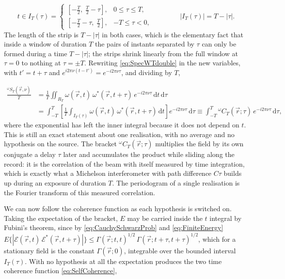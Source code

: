 		\begin{equation}\label{eq:StripLimits}
			t\in I_{T}(\tau) =
			\begin{cases}
				\left[-\frac{T}{2},\;\frac{T}{2}-\tau\right], & 0\leq\tau\leq T,\\[2mm]
				\left[-\frac{T}{2}-\tau,\;\frac{T}{2}\right], & -T\leq\tau<0,
			\end{cases}
			\qquad\qquad
			|I_{T}(\tau)| = T-|\tau| .
		\end{equation}
		The length of the strip is $T-|\tau|$ in both cases, which is the elementary fact that
		inside a window of duration $T$ the pairs of instants separated by $\tau$ can only be
		formed during a time $T-|\tau|$; the strips shrink linearly from the full window at
		$\tau=0$ to nothing at $\tau=\pm T$. Rewriting \eqref{eq:SpecWTdouble} in the new
		variables, with $t'=t+\tau$ and $e^{i2\pi\nu(t-t')}=e^{-i2\pi\nu\tau}$, and dividing by
		$T$,

		\begin{align}
			\frac{{}^\omega S_{T}(\vec{r},\nu)}{T}
			&= \frac{1}{T}\iint_{R_{T}}\omega(\vec{r},t)\,\omega^{*}(\vec{r},t+\tau)\,e^{-i2\pi\nu\tau}\,\mathrm{d}t\,\mathrm{d}\tau \nonumber\\
			&= \int_{-T}^{T}\left[\frac{1}{T}\int_{I_{T}(\tau)}\omega(\vec{r},t)\,\omega^{*}(\vec{r},t+\tau)\,\mathrm{d}t\right]e^{-i2\pi\nu\tau}\,\mathrm{d}\tau
			\equiv \int_{-T}^{T}{}^{\omega}C_{T}(\vec{r};\tau)\,e^{-i2\pi\nu\tau}\,\mathrm{d}\tau , \label{eq:PeriodogramCorrelogram}
		\end{align}
		where the exponential has left the inner integral because it does not depend on $t$.
		This is still an exact statement about one realisation, with no average and no
		hypothesis on the source. The bracket ${}^{\omega}C_{T}(\vec{r};\tau)$ multiplies the
		field by its own conjugate a delay $\tau$ later and accumulates the product while
		sliding along the record: it is the correlation of the beam with itself measured by
		time integration, which is exactly what a Michelson interferometer with path difference
		$C\tau$ builds up during an exposure of duration $T$. The periodogram of a single
		realisation is the Fourier transform of this measured correlation.

		We can now follow the coherence function as each hypothesis is switched on. Taking the
		expectation of the bracket, $E$ may be carried inside the $t$ integral by Fubini's
		theorem, since by \eqref{eq:CauchySchwarzProb} and \eqref{eq:FiniteEnergy}
		$E\{|\mathcal{E}(\vec{r},t)\,\mathcal{E}^{*}(\vec{r},t+\tau)|\}\leq\Gamma(\vec{r};t,t)^{1/2}\,\Gamma(\vec{r};t+\tau,t+\tau)^{1/2}$,
		which for a stationary field is the constant $\Gamma(\vec{r};0)$, integrable over the
		bounded interval $I_{T}(\tau)$. With no hypothesis at all the expectation produces the
		two time coherence function \eqref{eq:SelfCoherence},

